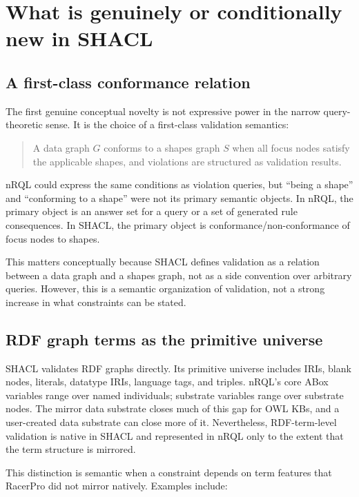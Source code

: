 \documentclass[11pt,letterpaper]{article}
\newcommand{\nrql}{nRQL}
\newcommand{\racer}{RacerPro}
\newcommand{\shacl}{SHACL}
\newcommand{\abox}{ABox}
\newcommand{\rdf}{RDF}
\newcommand{\owl}{OWL}
\begin{document}
\section{What is genuinely or conditionally new in SHACL}

\subsection{A first-class conformance relation}

The first genuine conceptual novelty is not expressive power in the narrow query-theoretic sense. It is the choice of a first-class validation semantics:

\begin{quote}
A data graph $G$ conforms to a shapes graph $S$ when all focus nodes satisfy the applicable shapes, and violations are structured as validation results.
\end{quote}

\nrql{} could express the same conditions as violation queries, but ``being a shape'' and ``conforming to a shape'' were not its primary semantic objects. In \nrql{}, the primary object is an answer set for a query or a set of generated rule consequences. In \shacl{}, the primary object is conformance/non-conformance of focus nodes to shapes.

This matters conceptually because \shacl{} defines validation as a relation between a data graph and a shapes graph, not as a side convention over arbitrary queries. However, this is a semantic organization of validation, not a strong increase in what constraints can be stated.

\subsection{RDF graph terms as the primitive universe}

\shacl{} validates \rdf{} graphs directly. Its primitive universe includes IRIs, blank nodes, literals, datatype IRIs, language tags, and triples. \nrql{}'s core \abox{} variables range over named individuals; substrate variables range over substrate nodes. The mirror data substrate closes much of this gap for \owl{} KBs, and a user-created data substrate can close more of it. Nevertheless, \rdf{}-term-level validation is native in \shacl{} and represented in \nrql{} only to the extent that the term structure is mirrored.

This distinction is semantic when a constraint depends on term features that \racer{} did not mirror natively. Examples include:
\end{document}
